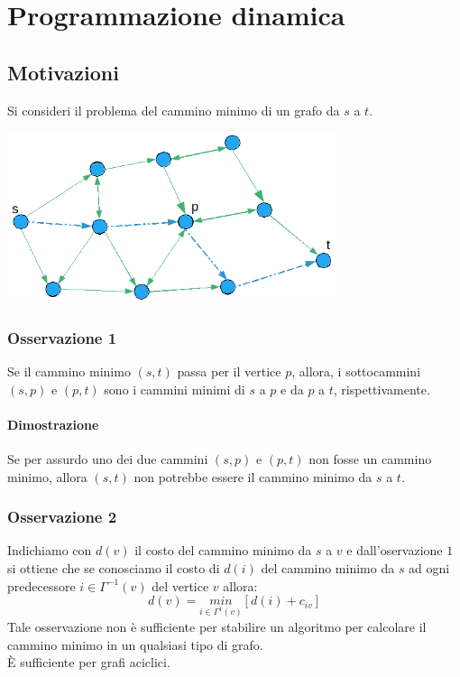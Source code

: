 \chapter{Programmazione dinamica}
\section{Motivazioni}
Si consideri il problema del cammino minimo di un grafo da $s$ a $t$.\\
\centerline{\includegraphics[height=5cm]{images/graph37.png}}
\subsection{Osservazione 1}
Se il cammino minimo $(s,t)$ passa per il vertice $p$, allora, i sottocammini $(s,p)$ e $(p,t)$ sono i cammini minimi di $s$ a $p$ e da $p$ a $t$, rispettivamente.
\subsubsection{Dimostrazione}
Se per assurdo uno dei due cammini $(s,p)$ e $(p,t)$ non fosse un cammino minimo, allora $(s,t)$ non potrebbe essere il cammino minimo da $s$ a $t$.
\subsection{Osservazione 2}
Indichiamo con $d(v)$ il costo del cammino minimo da $s$ a $v$ e dall'oservazione $1$ si ottiene che se conosciamo il costo di $d(i)$ del cammino minimo da $s$ ad ogni predecessore $i\in \Gamma^{-1}(v)$ del vertice $v$ allora:
\begin{equation}
	d(v)=\underset{i\in\Gamma^{1}(v)}{min}[d(i)+c_{iv}] \label{eq:4.1}
\end{equation}
Tale osservazione non è sufficiente per stabilire un algoritmo per calcolare il cammino minimo in un qualsiasi tipo di grafo.\\
È sufficiente per grafi aciclici.

